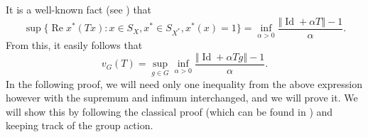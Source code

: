 \documentclass[a4paper,12pt]{amsart}
\theoremstyle{definition}
\theoremstyle{definition}
\theoremstyle{remark}
\numberwithin{equation}{section}
\DeclareMathOperator{\re}{Re}
\DeclareMathOperator{\id}{Id}
\newcommand{\<}{\langle}
\renewcommand{\>}{\rangle}
\newcommand{\norm}[1]{\left\Vert#1\right\Vert}
\begin{document}
	
	
	It is a well-known fact (see \cite[Chapter 2, \S 2, Theorem 5]{BonsallDuncanV1}) that
	\begin{equation*}
		\sup \{ \re x^*(T x) : x \in S_X, x^* \in S_{X^*}, x^*(x) = 1 \} = \inf_{\alpha > 0} \frac{\norm{\id + \alpha T} - 1}{\alpha}.
	\end{equation*}
	From this, it easily follows that
	\begin{equation*}
		v_G(T) = \sup_{g \in G} \inf_{\alpha > 0} \frac{\norm{\id + \alpha Tg} - 1}{\alpha}.
	\end{equation*}
	In the following proof, we will need only one inequality from the above expression however with the supremum and infimum interchanged, and we will prove it. We will show this by following the classical proof (which can be found in \cite[Chapter 3, \S 9, Lemma 2]{BonsallDuncanV1}) and keeping track of the group action.
	
	
	
\end{document}
